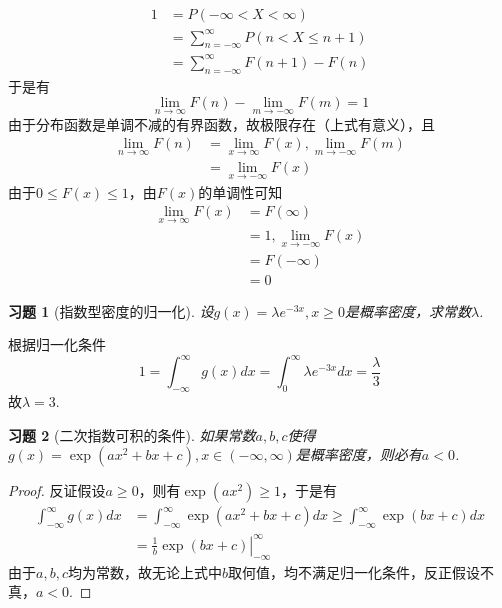 \documentclass[12pt,fontset=fandol]{ctexart}
\newtheorem{exercise}{习题}[section]
\begin{document}
\begin{solve}\label{a:Y3.1}
\[\begin{aligned}1&=P( - \infty  < X < \infty ) \\&= \sum\limits_{n =  - \infty }^\infty  {P(n < X \leqslant n + 1)}  \\&= \sum\limits_{n =  - \infty }^\infty  {F(n + 1) - F(n)} \end{aligned}\]
于是有
\[\mathop {\lim }\limits_{n \to \infty } F(n) - \mathop {\lim }\limits_{m \to  - \infty } F(m) = 1\]
由于分布函数是单调不减的有界函数，故极限存在（上式有意义），且
\[\begin{aligned}\mathop {\lim }\limits_{n \to   \infty } F\left( n \right) &= \mathop {\lim }\limits_{x \to   \infty } F(x),\mathop {\lim }\limits_{m \to  - \infty } F\left( m \right) \\&= \mathop {\lim }\limits_{x \to  - \infty } F(x)\end{aligned}\]
由于$0\leqslant F(x)\leqslant 1$，由$F(x)$的单调性可知
\[\begin{aligned}\mathop {\lim }\limits_{x \to \infty } F(x) &= F(\infty ) \\&= 1,\mathop {\lim }\limits_{x \to  - \infty } F(x) \\&= F( - \infty ) \\&= 0\end{aligned}\]
\end{solve}

\begin{exercise}[指数型密度的归一化]\label{q:Y3.2}
设$g(x)=\lambda e^{-3x},x\geqslant 0$是概率密度，求常数$\lambda$.\par{}
\end{exercise}

\begin{solve}\label{a:Y3.2}
根据归一化条件
\[1 = \int_{ - \infty }^\infty  {g(x)dx}  = \int_0^\infty  {\lambda {e^{ - 3x}}dx}  = \frac{\lambda }{3}\]
故$\lambda=3$.
\end{solve}

\begin{exercise}[二次指数可积的条件]\label{q:Y3.3}
如果常数$a,b,c$使得$g(x)=\exp(ax^2+bx+c),x\in (-\infty,\infty)$是概率密度，则必有$a<0$.\par{}
\end{exercise}

\begin{proof}\label{a:Y3.3}
反证假设$a\geqslant 0$，则有$\exp(ax^2)\geqslant 1$，于是有
\[\begin{aligned}\int_{ - \infty }^\infty  {g(x)dx}  &= \int_{ - \infty }^\infty  {\exp (a{x^2} + bx + c)dx}  \geqslant \int_{ - \infty }^\infty  {\exp (bx + c)dx}  \\&= \left. {\frac{1}{b}\exp (bx + c)} \right|_{ - \infty }^\infty \end{aligned}\]
由于$a,b,c$均为常数，故无论上式中$b$取何值，均不满足归一化条件，反正假设不真，$a<0$.
\end{proof}
\end{document}
